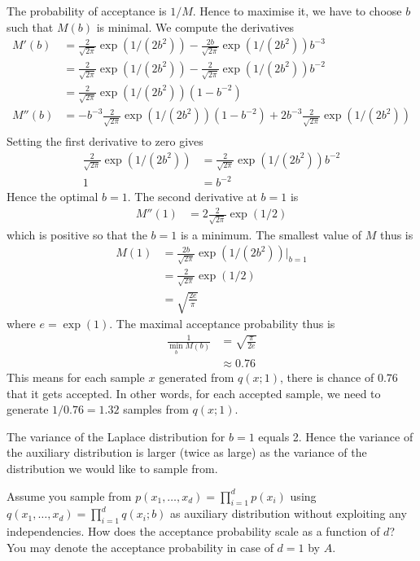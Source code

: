 \begin{exenumerate}
  \begin{solution}
    The probability of acceptance is $1/M$. Hence to maximise it, we
    have to choose $b$ such that $M(b)$ is minimal. We compute the derivatives
    \begin{align}
      M'(b) & = \frac{2}{\sqrt{2\pi}} \exp(1/(2b^2)) - \frac{2b}{\sqrt{2\pi}} \exp(1/(2b^2)) b^{-3}\\
      & = \frac{2}{\sqrt{2\pi}} \exp(1/(2b^2)) - \frac{2}{\sqrt{2\pi}} \exp(1/(2b^2)) b^{-2}\\
      & = \frac{2}{\sqrt{2\pi}} \exp(1/(2b^2))(1-b^{-2})\\
      M''(b) & = -b^{-3}\frac{2}{\sqrt{2\pi}} \exp(1/(2b^2))(1-b^{-2})+2b^{-3}\frac{2}{\sqrt{2\pi}} \exp(1/(2b^2))\\
    \end{align}
    Setting the first derivative to zero gives
    \begin{align}
      \frac{2}{\sqrt{2\pi}} \exp(1/(2b^2)) &= \frac{2}{\sqrt{2\pi}} \exp(1/(2b^2)) b^{-2}\\
      1 & = b^{-2}
    \end{align}
    Hence the optimal $b=1$. The second derivative at $b=1$ is
    \begin{align}
      M''(1) & = 2 \frac{2}{\sqrt{2\pi}} \exp(1/2)
    \end{align}
    which is positive so that the $b=1$ is a minimum. The smallest value of $M$ thus is
    \begin{align}
      M(1) & =  \frac{2b}{\sqrt{2\pi}} \exp(1/(2b^2))\Big |_{b=1} \\
      & =  \frac{2}{\sqrt{2\pi}} \exp(1/2)\\
      & =  \sqrt{\frac{2 e}{\pi}}
    \end{align}
    where $e=\exp(1)$. The maximal acceptance probability thus is
    \begin{align}
      \frac{1}{\min_b M(b)} & = \sqrt{\frac{\pi}{2e}}\\
      & \approx 0.76
    \end{align}
    This means for each sample $x$ generated from $q(x; 1)$, there is
    chance of $0.76$ that it gets accepted. In other words, for each
    accepted sample, we need to generate $1/0.76 = 1.32$ samples from
    $q(x; 1)$.

    The variance of the Laplace distribution for $b=1$ equals 2. Hence
    the variance of the auxiliary distribution is larger (twice as
    large) as the variance of the distribution we would like to sample from. 
  \end{solution}
\item Assume you sample from $p(x_1, \ldots, x_d) = \prod_{i=1}^d
  p(x_i)$ using $q(x_1, \ldots, x_d) = \prod_{i=1}^d q(x_i; b)$ as
  auxiliary distribution without exploiting any independencies. How
  does the acceptance probability scale as a function of $d$? You may
  denote the acceptance probability in case of $d=1$ by $A$.


\end{exenumerate}

